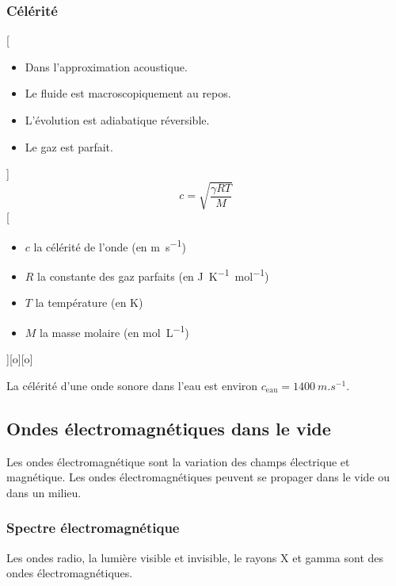 \subsubsection{Célérité}
[
    \begin{itemize}
        \item Dans l'approximation acoustique.
        \item Le fluide est macroscopiquement au repos.
        \item L'évolution est adiabatique réversible.
        \item Le gaz est parfait.
    \end{itemize}
]
{
    $$c=\sqrt{\frac{\gamma R T}{M}}$$
}
[
    \begin{itemize}
        \item $c$ la célérité de l'onde (en \unit{m.s^{-1}})
        \item $R$ la constante des gaz parfaits (en \unit{J.K^{-1}.mol^{-1}})
        \item $T$ la température (en \unit{K})
        \item $M$ la masse molaire (en \unit{mol.L^{-1}})
    \end{itemize}
][o][o]


La célérité d'une onde sonore dans l'eau est environ $c_\text{eau}=\SI{1400}{m.s^{-1}}$.

\subsection{Ondes électromagnétiques dans le vide}
Les ondes électromagnétique sont la variation des champs électrique et magnétique. Les ondes électromagnétiques peuvent se propager dans le vide ou dans un milieu.
\subsubsection{Spectre électromagnétique}
Les ondes radio, la lumière visible et invisible, le rayons X et gamma sont des ondes électromagnétiques.
\begin{center}
    
\end{center}
